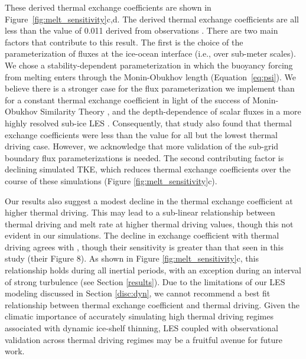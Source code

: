 \documentclass[draft]{styles/agujournal2019}
\begin{document}
These derived thermal exchange coefficients are shown in Figure~\ref{fig:melt_sensitivity}c,d. The derived thermal exchange coefficients are all less than the value of 0.011 derived from observations \cite{jenkins_observation_2010}. There are two main factors that contribute to this result. The first is the choice of the parameterization of fluxes at the ice-ocean interface (i.e., over sub-meter scales). We chose a stability-dependent parameterization in which the buoyancy forcing from melting enters through the Monin-Obukhov length (Equation~\ref{eq:psi}). We believe there is a stronger case for the flux parameterization we implement than for a constant thermal exchange coefficient in light of the success of Monin-Obukhov Similarity Theory \cite{monin_basic_1954, mcphee_air-ice-ocean_2008}, and the depth-dependence of scalar fluxes in a more highly resolved sub-ice LES \cite{vreugdenhil_stratification_2019}. Consequently, that study also found that thermal exchange coefficients were less than the  value for all but the lowest thermal driving case. However, we acknowledge that more validation of the sub-grid boundary flux parameterizations is needed. The second contributing factor is declining simulated TKE, which reduces thermal exchange coefficients over the course of these simulations (Figure \ref{fig:melt_sensitivity}c). 

Our results also suggest a modest decline in the thermal exchange coefficient at higher thermal driving. This may lead to a sub-linear relationship between thermal driving and melt rate at higher thermal driving values, though this not evident in our simulations. The decline in exchange coefficient with thermal driving agrees with , though their sensitivity is greater than that seen in this study (their Figure 8). As shown in Figure \ref{fig:melt_sensitivity}c, this relationship holds during all inertial periods, with an exception during an interval of strong turbulence (see Section \ref{results}). Due to the limitations of our LES modeling discussed in Section \ref{disc:dyn}, we cannot recommend a best fit relationship between thermal exchange coefficient and thermal driving. Given the climatic importance of accurately simulating high thermal driving regimes associated with dynamic ice-shelf thinning, LES coupled with observational validation across thermal driving regimes may be a fruitful avenue for future work.
\end{document}
